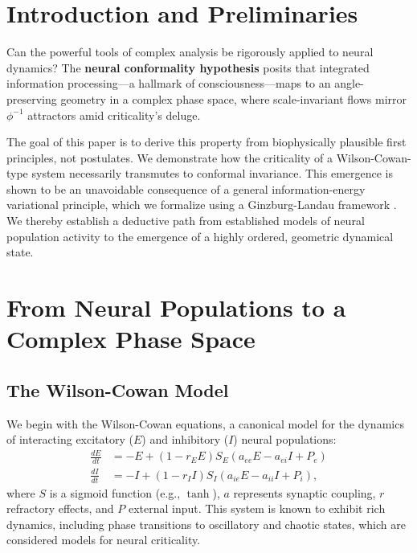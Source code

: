 \documentclass[12pt, reqno]{amsart}
\theoremstyle{definition}
\theoremstyle{remark}
\numberwithin{equation}{section}
\begin{document}

\section{Introduction and Preliminaries}

\noindent Can the powerful tools of complex analysis be rigorously applied to neural dynamics? The \textbf{neural conformality hypothesis} posits that integrated information processing—a hallmark of consciousness—maps to an angle-preserving geometry in a complex phase space, where scale-invariant flows mirror $\phi^{-1}$ attractors amid criticality's deluge.

The goal of this paper is to derive this property from biophysically plausible first principles, not postulates. We demonstrate how the criticality of a Wilson-Cowan-type system \cite{WilsonCowan} necessarily transmutes to conformal invariance. This emergence is shown to be an unavoidable consequence of a general information-energy variational principle, which we formalize using a Ginzburg-Landau framework \cite{GinzburgLandau}. We thereby establish a deductive path from established models of neural population activity to the emergence of a highly ordered, geometric dynamical state.

\section{From Neural Populations to a Complex Phase Space}

\subsection{The Wilson-Cowan Model}
We begin with the Wilson-Cowan equations, a canonical model for the dynamics of interacting excitatory ($E$) and inhibitory ($I$) neural populations:
\begin{align}
\frac{dE}{dt} &= -E + (1 - r_E E) S_E(a_{ee} E - a_{ei} I + P_e) \\
\frac{dI}{dt} &= -I + (1 - r_I I) S_I(a_{ie} E - a_{ii} I + P_i),
\end{align}
where $S$ is a sigmoid function (e.g., $\tanh$), $a$ represents synaptic coupling, $r$ refractory effects, and $P$ external input. This system is known to exhibit rich dynamics, including phase transitions to oscillatory and chaotic states, which are considered models for neural criticality.
\end{document}
